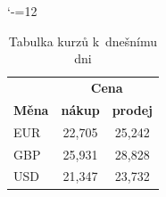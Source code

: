 \documentclass[a4paper, 11pt]{article}
\begin{document}
\bigskip

\begin{table}[h]
    \centering
    \catcode`-=12
    \begin{tabular}{|l|c|c|}
        \hline
                        &\multicolumn{2}{c|}{\textbf{Cena}}\\ \cline{2-3} 
        \textbf{Měna}   &\textbf{nákup} &\textbf{prodej}\\ \hline
        EUR             &22,705         &25,242\\
        GBP             &25,931         &28,828\\
        USD             &21,347         &23,732\\ \hline
    \end{tabular}
    \caption{Tabulka kurzů k~dnešnímu dni}\label{tabulka_kurzy}
\end{table}

\bigskip
\end{document}
